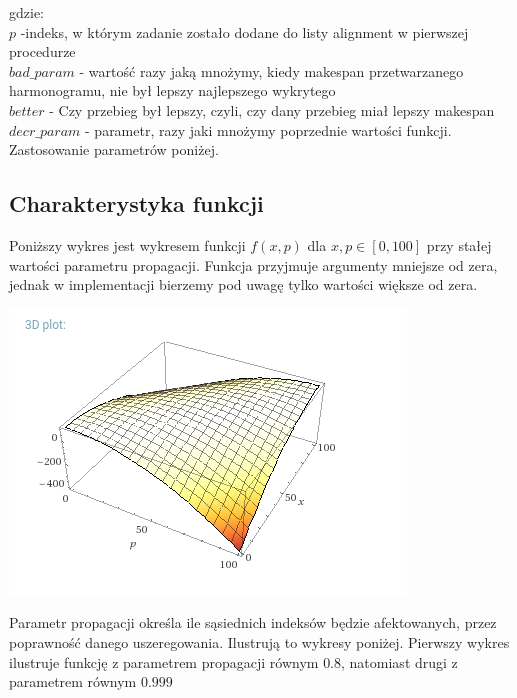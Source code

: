 \documentclass[11pt,twocolumn]{article}
\begin{document}
gdzie:\\
$p$ -indeks, w którym zadanie zostało dodane do listy alignment w pierwszej procedurze\\
$bad\_param$ - wartość razy jaką mnożymy, kiedy makespan przetwarzanego harmonogramu, nie był lepszy najlepszego wykrytego\\
$better$ - Czy przebieg był lepszy, czyli, czy dany przebieg miał lepszy makespan\\
$decr\_param$ - parametr, razy jaki mnożymy poprzednie wartości funkcji. Zastosowanie parametrów poniżej.

\subsection{Charakterystyka funkcji}

Poniższy wykres jest wykresem funkcji $f(x,p)$ dla $x,p \in [0,100]$
przy stałej wartości parametru propagacji.
Funkcja przyjmuje argumenty mniejsze od zera, jednak w implementacji bierzemy pod uwagę tylko wartości większe od zera.

\includegraphics[width=\linewidth]{0999.png}

Parametr propagacji określa ile sąsiednich indeksów będzie afektowanych, przez poprawność danego uszeregowania. Ilustrują to wykresy poniżej. Pierwszy wykres ilustruje funkcję z parametrem propagacji równym $0.8$, natomiast drugi z parametrem równym $0.999$
\end{document}
